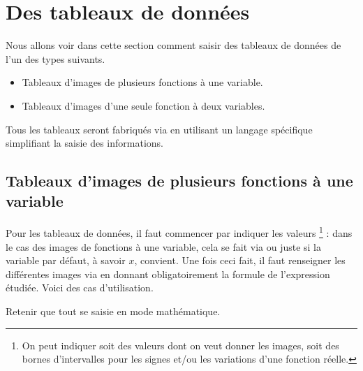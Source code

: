 \documentclass[10pt, a4paper]{article}
\begin{document}
\section{Des tableaux de données}

Nous allons voir dans cette section comment saisir des tableaux de données de l'un des types suivants.
\begin{itemize}
	\item Tableaux d'images de plusieurs fonctions à une variable.

	\item Tableaux d'images d'une seule fonction à deux variables.
\end{itemize}


\begin{tdocnote}
	Tous les tableaux seront fabriqués via  en utilisant un langage spécifique simplifiant la saisie des informations.
\end{tdocnote}





\subsection{Tableaux d'images de plusieurs fonctions à une variable}

Pour les tableaux de données, il faut commencer par indiquer les valeurs 
\footnote{
	 On peut indiquer soit des valeurs dont on veut donner les images, soit des bornes d'intervalles pour les signes et/ou les variations d'une fonction réelle.
} :
dans le cas des images de fonctions à une variable, cela se fait via
ou juste
si la variable par défaut, à savoir $x$, convient.
Une fois ceci fait, il faut renseigner les différentes images via  en donnant obligatoirement la formule de l'expression étudiée.
Voici des cas d'utilisation.




\begin{tdocexa}
    \leavevmode

\end{tdocexa}


\begin{tdocnote}
	Retenir que tout se saisie en mode mathématique.
\end{tdocnote}
\end{document}
